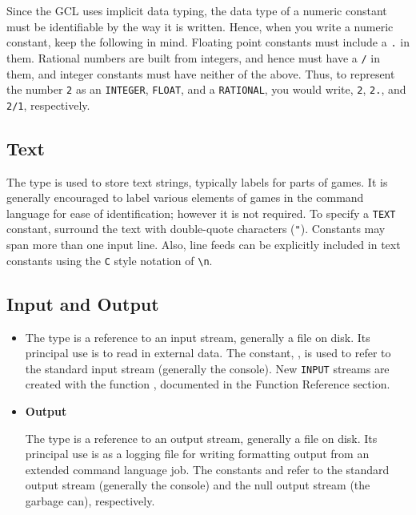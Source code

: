 Since the GCL uses implicit data typing, the data type of a numeric
constant must be identifiable by the way it is written.  Hence, when
you write a numeric constant, keep the following in mind.  Floating
point constants must include a \verb+.+ in them.  Rational numbers are
built from integers, and hence must have a \verb+/+ in them, and
integer constants must have neither of the above. Thus, to represent
the number \verb+2+ as an \verb+INTEGER+, \verb+FLOAT+, and a
\verb+RATIONAL+, you would write, \verb+2+, \verb+2.+, and \verb+2/1+,
respectively.

\subsection{Text}

The  type is used to store text strings, typically labels
for parts of games.  It is generally encouraged to label various
elements of games in the command language for ease of identification;
however it is not required.  To specify a {\tt TEXT} constant,
surround the text with double-quote characters ({\tt "}).  Constants
may span more than one input line.  Also, line feeds can be explicitly
included in text constants using the \verb+C+ style notation of
\verb+\n+. 

\subsection{Input and Output}

\begin{itemize}
\item{}

The  type is a reference to an input stream, generally a
file on disk.  Its principal use is to read in external data.  The
constant, , is used to refer to the standard input stream
(generally the console).  New \verb+INPUT+ streams are created with
the function , documented in the Function Reference
section.

\item {\bf Output}

The  type is a reference to an output stream, generally a
file on disk.  Its principal use is as a logging file for writing
formatting output from an extended command language job.  The
constants  and  refer to the standard
output stream (generally the console) and the null output stream (the
garbage can), respectively.
\end{itemize}


